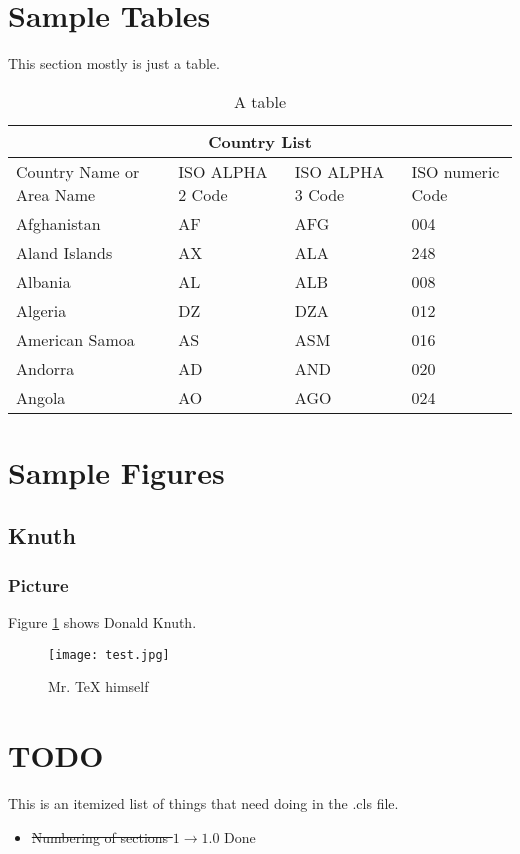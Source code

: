 \documentclass[ece]{uw-wkrpt}
\begin{document}
\section{Sample Tables}
This section mostly is just a table.
    \begin{table}[h]
        \centering
        \caption{A table}
        \label{tab:test}
        \begin{tabular}{ |p{3cm}||p{3cm}|p{3cm}|p{3cm}|  }
         \hline
         \multicolumn{4}{|c|}{Country List} \\
         \hline
         Country Name     or Area Name& ISO ALPHA 2 Code &ISO ALPHA 3 Code&ISO numeric Code\\
         \hline
         Afghanistan   & AF    &AFG&   004\\
         Aland Islands&   AX  & ALA   &248\\
         Albania &AL & ALB&  008\\
         Algeria    &DZ & DZA&  012\\
         American Samoa&   AS  & ASM&016\\
         Andorra& AD  & AND   &020\\
         Angola& AO  & AGO&024\\
         \hline
        \end{tabular}
    \end{table}

\section{Sample Figures}
    \subsection{Knuth}
        \subsubsection{Picture}
            Figure \ref{fig:knuth} shows Donald Knuth. \cite{ref:donpicture}
            \begin{figure}
                \centering
                \texttt{[image: test.jpg]}
                \caption{Mr. \TeX{} himself }
                \label{fig:knuth}
            \end{figure}

\section{TODO}
This is an itemized list of things that need doing in the .cls file. \cite{ref:latex2e}
\begin{itemize}
    \item \sout{Numbering of sections $1 \rightarrow 1.0$} Done
\end{itemize}
\end{document}
